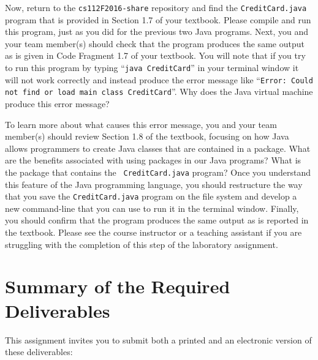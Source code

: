 Now, return to the {\tt cs112F2016-share} repository and find the {\tt CreditCard.java} program that is provided in
Section 1.7 of your textbook. Please compile and run this program, just as you did for the previous two Java programs.
Next, you and your team member(s) should check that the program produces the same output as is given in Code Fragment
1.7 of your textbook. You will note that if you try to run this program by typing ``{\tt java CreditCard}'' in your
terminal window it will not work correctly and instead produce the error message like ``{\tt Error: Could not find or
load main class CreditCard}''. Why does the Java virtual machine produce this error message?

To learn more about what causes this error message, you and your team member(s) should review Section 1.8 of the
textbook, focusing on how Java allows programmers to create Java classes that are contained in a package. What are the
benefits associated with using packages in our Java programs? What is the package that contains the {\tt
CreditCard.java} program? Once you understand this feature of the Java programming language, you should restructure the
way that you save the {\tt CreditCard.java} program on the file system and develop a new command-line that you can use
to run it in the terminal window. Finally, you should confirm that the program produces the same output as is reported
in the textbook. Please see the course instructor or a teaching assistant if you are struggling with the completion of
this step of the laboratory assignment.

\section*{Summary of the Required Deliverables}

This assignment invites you to submit both a printed and an electronic version of these deliverables:

